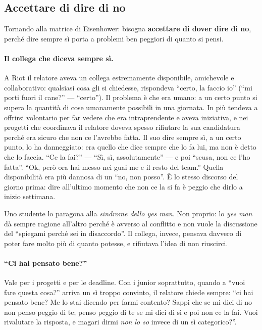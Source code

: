 \subsection{Accettare di dire di no}

Tornando alla matrice di Eisenhower: bisogna \textbf{accettare di dover dire di
no}, perché dire sempre sì porta a problemi ben peggiori di quanto si pensi.

\paragraph{Il collega che diceva sempre sì.} A Riot il relatore aveva un collega
estremamente disponibile, amichevole e collaborativo: qualsiasi cosa gli si
chiedesse, rispondeva ``certo, la faccio io'' (``mi porti fuori il cane?'' ---
``certo''). Il problema è che era umano: a un certo punto si supera la quantità di
cose umanamente possibili in una giornata. In più tendeva a offrirsi volontario
per far vedere che era intraprendente e aveva iniziativa, e nei progetti che
coordinava il relatore doveva spesso rifiutare la sua candidatura perché era
sicuro che non ce l'avrebbe fatta. Il suo dire sempre sì, a un certo punto, lo ha
danneggiato: era quello che dice sempre che lo fa lui, ma non è detto che lo
faccia. ``Ce la fai?'' --- ``Sì, sì, assolutamente'' --- e poi ``scusa, non ce l'ho
fatta''. ``Ok, però ora hai messo nei guai me e il resto del team.'' Quella
disponibilità era più dannosa di un ``no, non posso''. È lo stesso discorso del
giorno prima: dire all'ultimo momento che non ce la si fa è peggio che dirlo a
inizio settimana.

Uno studente lo paragona alla \emph{sindrome dello yes man}. Non proprio: lo
\emph{yes man} dà sempre ragione all'altro perché è avverso al conflitto e non vuole
la discussione del ``spiegami perché sei in disaccordo''. Il collega, invece,
pensava davvero di poter fare molto più di quanto potesse, e rifiutava l'idea di
non riuscirci.

\paragraph{``Ci hai pensato bene?''} Vale per i progetti e per le deadline. Con i
junior soprattutto, quando a ``vuoi fare questa cosa?'' arriva un sì troppo
convinto, il relatore chiede sempre: ``ci hai pensato bene? Me lo stai dicendo
per farmi contento? Sappi che se mi dici di no non penso peggio di te; penso
peggio di te se mi dici di sì e poi non ce la fai. Vuoi rivalutare la risposta, e
magari dirmi \emph{non lo so} invece di un sì categorico?''.

